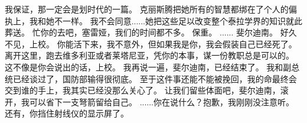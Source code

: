 \documentclass[openany]{book}
\begin{document}
\begin{dialogue}
     我保证，那一定会是划时代的一篇。
     克丽斯腾把她所有的智慧都绑在了个人的偏执上，我和她不一样。
     我不会同意......她把这些足以改变整个泰拉学界的知识就此葬送。
     忙你的去吧，塞雷娅，我们的时间都不多。
     保重。
     ......
     斐尔迪南。
     好久不见，上校。
     你能活下来，我不意外，但如果我是你，我会假装自己已经死了。
     离开这里，跑去维多利亚或者莱塔尼亚，凭你的本事，谋一份教职总是可以的。
     这不像是你会说出的话，上校。
     我再说一遍，斐尔迪南，已经结束了。
     我和副总统已经谈过了，国防部输得很彻底。
     至于这件事还能不能被挽回，我的命最终会交到谁的手上，我其实已经没那么关心了。
     让我们留些体面吧，斐尔迪南，滚开，我可以省下一支弩箭留给自己。
     ......你在说什么？抱歉，我刚刚没注意听。
     还有，你挡住射线仪的显示屏了。
\end{dialogue}
\end{document}

